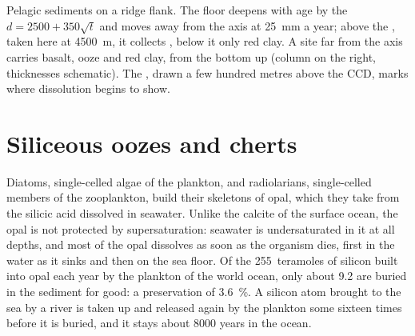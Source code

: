 \begin{omfigure}

{\small Pelagic sediments on a ridge flank. The floor deepens with age by the
 $d = 2500 + 350\sqrt t$ and moves away from the axis at
\qty{25}{mm} a year; above the , taken here at
\qty{4500}{m}, it collects , below it only red clay. A site far
from the axis carries basalt, ooze and red clay, from the bottom up (column on
the right, thicknesses schematic). The , drawn a few hundred metres
above the CCD, marks where dissolution begins to show.}
\label{fig:b1:chemical-biogenic-sediments:flank}
\end{omfigure}

\section{Siliceous oozes and cherts}\label{sec:b1:chemical-biogenic-sediments:silica}

Diatoms, single-celled algae of the plankton, and radiolarians, single-celled
members of the zooplankton, build their skeletons of opal, which they take from
the silicic acid dissolved in seawater. Unlike the calcite of the surface ocean,
the opal is not protected by supersaturation: seawater is undersaturated in it
at all depths, and most of the opal dissolves as soon as the organism dies,
first in the water as it sinks and then on the sea floor. Of the 255~teramoles
of silicon built into opal each year by the plankton of the world ocean, only
about 9.2 are buried in the sediment for good: a preservation of
\qty{3.6}{\%}. A silicon atom brought to the sea by a river is taken up and
released again by the plankton some sixteen times before it is buried, and it
stays about \num{8000} years in the ocean.

